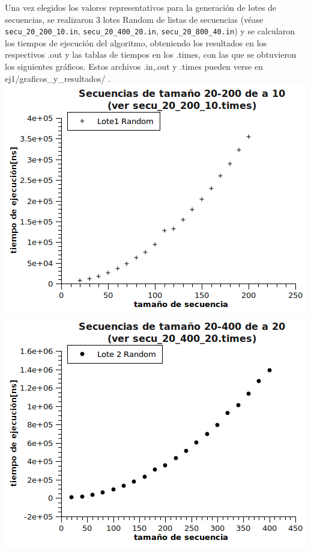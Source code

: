 Una vez elegidos los valores representativos para la generación de lotes de secuencias, se realizaron 3 lotes Random de listas de secuencias (véase \texttt{secu\_20\_200\_10.in}, \texttt{secu\_20\_400\_20.in}, \texttt{secu\_20\_800\_40.in}) y se calcularon los tiempos de ejecución del algoritmo, obteniendo los resultados en los respectivos .out y las tablas de tiempos en los .times, con las que se obtuvieron los siguientes gráficos.
Estos archivos .in,.out y .times pueden verse en ej1/graficos\_y\_resultados/ .
\newline
\newline
\includegraphics[scale=0.8]{img/ej1/Lote1.png}
\newline
\includegraphics[scale=0.8]{img/ej1/Lote2.png}
